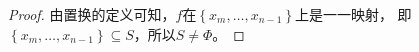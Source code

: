 \begin{questions}
\begin{solution}
\begin{proof}
            由置换的定义可知，$f$在$\left\{x_m, \dots , x_{n-1} \right\}$上是一一映射，
            即$\left\{x_m, \dots , x_{n-1} \right\} \subseteq S$，所以$S \neq \Phi$。

        \end{proof}
    \end{solution}

\end{questions}

